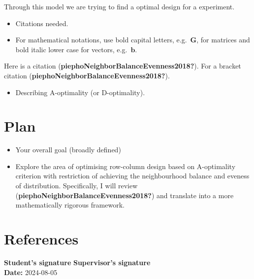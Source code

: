 \documentclass[
  12pt,
]{amsart}
\providecommand{\tightlist}{%
  \setlength{\itemsep}{0pt}\setlength{\parskip}{0pt}}\usepackage{longtable,booktabs,array}
\begin{document}
Through this model we are trying to find a optimal design for a
experiment.

\begin{itemize}
\tightlist
\item
  Citations needed.
\item
  For mathematical notations, use bold capital letters,
  e.g.~\(\textbf{G}\), for matrices and bold italic lower case for
  vectors, e.g.~\(\boldsymbol{b}\).
\end{itemize}

Here is a citation (\textbf{piephoNeighborBalanceEvenness2018?}). For a
bracket citation (\textbf{piephoNeighborBalanceEvenness2018?}).

\begin{itemize}
\tightlist
\item
  Describing A-optimality (or D-optimality).
\end{itemize}

\section{Plan}\label{plan}

\begin{itemize}
\tightlist
\item
  Your overall goal (broadly defined)
\item
  Explore the area of optimising row-column design based on A-optimality
  criterion with restriction of achieving the neighbourhood balance and
  eveness of distribution. Specifically, I will review
  (\textbf{piephoNeighborBalanceEvenness2018?}) and translate into a
  more mathematically rigorous framework.
\end{itemize}

\section{References}\label{references}



\vfill

\noindent
\textbf{Student's signature} \hfill \textbf{Supervisor's signature} \hspace{10em} \mbox{}\\

\noindent
\textbf{Date:} 2024-08-05
\end{document}
